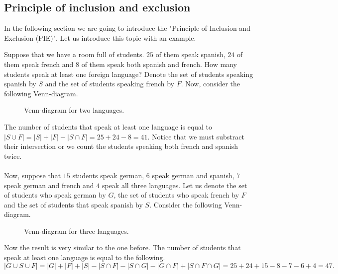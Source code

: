 \subsection[PIE]{Principle of inclusion and exclusion}

In the following section we are going to introduce the "Principle of Inclusion and Exclusion (PIE)". Let us introduce this topic
with an example.

\begin{exmp}
Suppose that we have a room full of students. $25$ of them speak spanish, $24$ of them speak french and $8$ of them speak both spanish 
and french. How many students speak at least one foreign language? Denote the set of students speaking spanish by $S$ and the 
set of students speaking french by $F$. Now, consider the following Venn-diagram.
\begin{figure}[H]
    \centering
    \caption{Venn-diagram for two languages.}
\end{figure}

The number of students that speak at least one language is equal to $|S \cup F|=|S| + |F|-|S \cap F|=25+24-8=41$. Notice that we must substract their intersection 
or we count the students speaking both french and spanish twice.\\\\
Now, suppose that $15$ students speak german, $6$ speak german and spanish, $7$ speak german and french and 
$4$ speak all three languages. Let us denote the set of students who speak german by $G$, the set of students who speak french by $F$ 
and the set of students that speak spanish by $S$. Consider the following Venn-diagram.

\begin{figure}[H]
    \centering
    \caption{Venn-diagram for three languages.}
\end{figure}
Now the result is very similar to the one before. The number of students that speak at least one language is equal to the following.
$$
|G \cup S \cup F|=|G| + |F| + |S| - |S \cap F| - |S \cap G| - |G \cap F| + |S \cap F \cap G|=25+24+15-8-7-6+4=47.
$$
\end{exmp}

